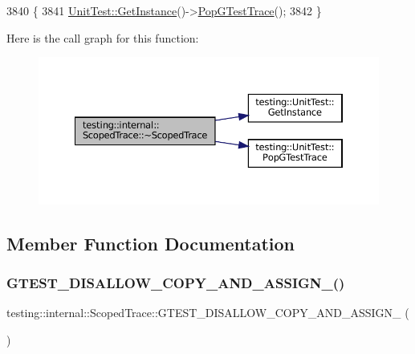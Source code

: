 \begin{DoxyCode}
3840                                           \{
3841   \hyperlink{classtesting_1_1UnitTest_a24192400b70b3b946746954e9574fb8e}{UnitTest::GetInstance}()->\hyperlink{classtesting_1_1UnitTest_a70b3e3282778bc9a36520fe0a8be3c57}{PopGTestTrace}();
3842 \}
\end{DoxyCode}
Here is the call graph for this function\+:
\nopagebreak
\begin{figure}[H]
\begin{center}
\leavevmode
\includegraphics[width=350pt]{classtesting_1_1internal_1_1ScopedTrace_a658c7c098ff48337058bfa2ccab65881_cgraph}
\end{center}
\end{figure}


\subsection{Member Function Documentation}
\mbox{\label{classtesting_1_1internal_1_1ScopedTrace_a0c896625ebd31d5cf7a2e7038df1c2b5}} 
\subsubsection{\texorpdfstring{G\+T\+E\+S\+T\+\_\+\+D\+I\+S\+A\+L\+L\+O\+W\+\_\+\+C\+O\+P\+Y\+\_\+\+A\+N\+D\+\_\+\+A\+S\+S\+I\+G\+N\+\_\+()}{GTEST\_DISALLOW\_COPY\_AND\_ASSIGN\_()}}
{\footnotesize\ttfamily testing\+::internal\+::\+Scoped\+Trace\+::\+G\+T\+E\+S\+T\+\_\+\+D\+I\+S\+A\+L\+L\+O\+W\+\_\+\+C\+O\+P\+Y\+\_\+\+A\+N\+D\+\_\+\+A\+S\+S\+I\+G\+N\+\_\+ (\begin{DoxyParamCaption}\item[{\hyperlink{classtesting_1_1internal_1_1ScopedTrace}{Scoped\+Trace}}]{ }\end{DoxyParamCaption})\hspace{0.3cm}{\ttfamily [private]}}



